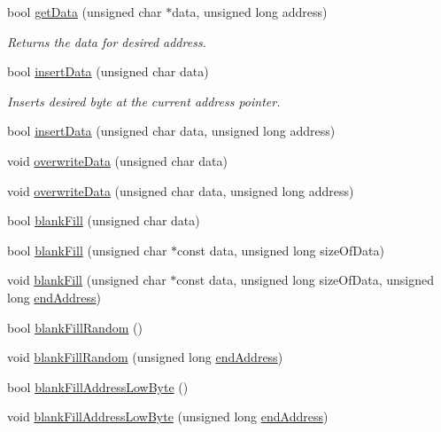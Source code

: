 \begin{DoxyCompactItemize}
bool \hyperlink{classintelhex_a6596b518a9a832ed8e6ba21a0e07861c}{get\-Data} (unsigned char $\ast$data, unsigned long address)
\begin{DoxyCompactList}\small\item\em Returns the data for desired address. \end{DoxyCompactList}\item 
bool \hyperlink{classintelhex_a71096983db3c24a5ac9b95663937a4ce}{insert\-Data} (unsigned char data)
\begin{DoxyCompactList}\small\item\em Inserts desired byte at the current address pointer. \end{DoxyCompactList}\item 
bool \hyperlink{classintelhex_a00ff4c491fabc5ef207071358e1b9298}{insert\-Data} (unsigned char data, unsigned long address)
\item 
void \hyperlink{classintelhex_ab4fc2715f4c63d3f31e8d2b0533583e5}{overwrite\-Data} (unsigned char data)
\item 
void \hyperlink{classintelhex_a83edcd2329cb52a4bab6bb46463184d7}{overwrite\-Data} (unsigned char data, unsigned long address)
\item 
bool \hyperlink{classintelhex_a5de5cf10103fc307127f9017f3e5cd76}{blank\-Fill} (unsigned char data)
\item 
bool \hyperlink{classintelhex_a84bbd449bb55e218b62ea73e2b399196}{blank\-Fill} (unsigned char $\ast$const data, unsigned long size\-Of\-Data)
\item 
void \hyperlink{classintelhex_aaf6f77af7a82623ef16471f105ac3fe7}{blank\-Fill} (unsigned char $\ast$const data, unsigned long size\-Of\-Data, unsigned long \hyperlink{classintelhex_a9b159bea81eb832e37f6cf88a57ca659}{end\-Address})
\item 
bool \hyperlink{classintelhex_a9c26ba3dc9dd4f3021bb6c7f6983388f}{blank\-Fill\-Random} ()
\item 
void \hyperlink{classintelhex_aa1dbcbf3df1aaafd518882c882f43f76}{blank\-Fill\-Random} (unsigned long \hyperlink{classintelhex_a9b159bea81eb832e37f6cf88a57ca659}{end\-Address})
\item 
bool \hyperlink{classintelhex_a2e5c67fccc34c78e6dbd28f4b795fb0f}{blank\-Fill\-Address\-Low\-Byte} ()
\item 
void \hyperlink{classintelhex_ab7b16f457563da93569b9812fafb9e7d}{blank\-Fill\-Address\-Low\-Byte} (unsigned long \hyperlink{classintelhex_a9b159bea81eb832e37f6cf88a57ca659}{end\-Address})
\item 

\end{DoxyCompactItemize}

